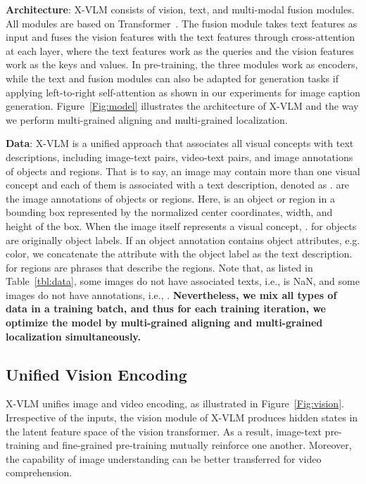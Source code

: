 \documentclass{article}
\newcommand{\baby}{X-VLM\xspace}
\begin{document}
\noindent\textbf{Architecture}: \baby consists of vision, text, and multi-modal fusion modules. All modules are based on Transformer~\cite{vaswani2017attention}. The fusion module takes text features as input and fuses the vision features with the text features through cross-attention at each layer, where the text features work as the queries and the vision features work as the keys and values. In pre-training, the three modules work as encoders, while the text and fusion modules can also be adapted for generation tasks if applying left-to-right self-attention as shown in our experiments for image caption generation. Figure~\ref{Fig:model} illustrates the architecture of \baby and the way we perform multi-grained aligning and multi-grained localization. 


\noindent\textbf{Data}: \baby is a unified approach that associates all visual concepts with text descriptions, including image-text pairs, video-text pairs, and image annotations of objects and regions. That is to say, an image may contain more than one visual concept and each of them is associated with a text description, denoted as .  are the image annotations of objects or regions. Here,  is an object or region in a bounding box  represented by the normalized center coordinates, width, and height of the box. When the image itself represents a visual concept, .  for objects are originally object labels. If an object annotation contains object attributes, e.g. color, we concatenate the attribute with the object label as the text description.  for regions are phrases that describe the regions. Note that, as listed in Table~\ref{tbl:data}, some images do not have associated texts, i.e.,  is NaN, and some images do not have annotations, i.e., . \textbf{Nevertheless, we mix all types of data in a training batch, and thus for each training iteration, we optimize the model by multi-grained aligning and multi-grained localization simultaneously. }














\subsection{Unified Vision Encoding}  


\baby unifies image and video encoding, as illustrated in Figure~\ref{Fig:vision}. Irrespective of the inputs, the vision module of \baby produces hidden states in the latent feature space of the vision transformer. As a result, image-text pre-training and fine-grained pre-training mutually reinforce one another. Moreover, the capability of image understanding can be better transferred for video comprehension. 
\end{document}
